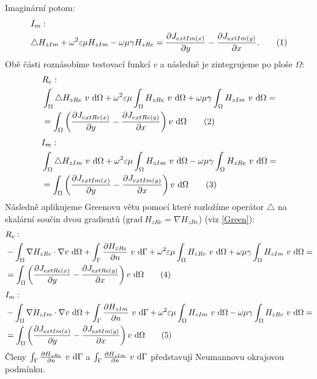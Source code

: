 \documentclass[12pt,a4paper,oneside]{article}
\numberwithin{equation}{section} %
\numberwithin{figure}{section} %
\numberwithin{table}{section} %
\newcommand{\grad}{\mathrm{grad}\ }
\newcommand\numberthis{\addtocounter{equation}{1}\tag{\theequation}}
\begin{document}
Imaginární potom:
\begin{align*}
&I_{m}:
\\
&\triangle H _{zIm} + \omega ^2 \varepsilon \mu H _{zIm} - \omega \mu \gamma H _{zRe} = \frac{\partial J _{extIm(x)}}{\partial y} - \frac{\partial J _{extIm(y)}}{\partial x} .
\numberthis
\end{align*}
Obě části roznásobíme testovací funkcí $v$ a následně je  zintegrujeme po ploše $\Omega$:
\begin{align*}
&R_e:
\\
&\int _{\Omega} \triangle H _{zRe} ~ v ~ \ud \Omega + \omega ^2 \varepsilon \mu \int _{\Omega} H _{zRe} ~ v ~ \ud \Omega + \omega \mu \gamma \int _{\Omega} H _{zIm} ~ v ~ \ud \Omega = 
\\
&= \int _{\Omega} \left( \frac{\partial J _{extRe(x)}}{\partial y} - \frac{\partial J _{extRe(y)}}{\partial x} \right) v ~ \ud \Omega
\numberthis
\end{align*}
\begin{align*}
&I_m:
\\
&\int _{\Omega} \triangle H _{zIm} ~ v ~ \ud \Omega + \omega ^2 \varepsilon \mu \int _{\Omega} H _{zIm} ~ v ~ \ud \Omega - \omega \mu \gamma \int _{\Omega} H _{zRe} ~ v ~ \ud \Omega = 
\\
&= \int _{\Omega} \left(\frac{\partial J _{extIm(x)}}{\partial y} - \frac{\partial J _{extIm(y)}}{\partial x} \right) v ~ \ud \Omega
\numberthis
\end{align*}
Následně aplikujeme Greenovu větu pomocí které rozložíme operátor $\triangle$ na skalární součin dvou gradientů ($\grad H _{zRe} = \nabla H _{zRe}$) (viz \ref{Green}):
\begin{align*}
&R_e:
\\
&- \int _{\Omega} \nabla H _{zRe} \cdot \nabla v ~ \ud \Omega + \int _{\Gamma} \frac{\partial H _{zRe}}{\partial n} ~ v ~ \ud \Gamma + \omega ^2 \varepsilon \mu \int _{\Omega} H _{zRe} ~ v ~ \ud \Omega + \omega \mu \gamma \int _{\Omega} H _{zIm} ~ v ~ \ud \Omega =
\\
&= \int _{\Omega} \left( \frac{\partial J _{extRe(x)}}{\partial y} - \frac{\partial J _{extRe(y)}}{\partial x} \right) v ~ \ud \Omega
\numberthis
\end{align*}
\begin{align*}
&I_m:
\\
&- \int _{\Omega} \nabla H _{zIm} \cdot \nabla v ~ \ud \Omega + \int _{\Gamma} \frac{\partial H _{zIm}}{\partial n} ~ v ~ \ud \Gamma + \omega ^2 \varepsilon \mu \int _{\Omega} H _{zIm} ~ v ~ \ud \Omega - \omega \mu \gamma \int _{\Omega} H _{zRe} ~ v ~ \ud \Omega = 
\\
&= \int _{\Omega} \left( \frac{\partial J _{extIm(x)}}{\partial y} - \frac{\partial J _{extIm(y)}}{\partial x} \right) v ~ \ud \Omega
\numberthis
\end{align*}
Členy $\int _{\Gamma} \frac{\partial H _{zRe}}{\partial n} ~ v ~ \mathrm{d} \Gamma$ a $\int _{\Gamma} \frac{\partial H _{zIm}}{\partial n} ~ v ~ \mathrm{d} \Gamma$ představují Neumannovu okrajovou podmínku.
\end{document}

